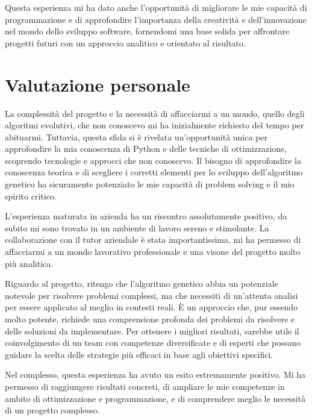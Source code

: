 Questa esperienza mi ha dato anche l'opportunità di migliorare le mie capacità di programmazione e di approfondire l'importanza della creatività e dell'innovazione nel mondo dello sviluppo software, fornendomi una base solida per affrontare progetti futuri con un approccio analitico e orientato al risultato.

\section{Valutazione personale}

La complessità del progetto e la necessità di affacciarmi a un mondo, quello degli algoritmi evolutivi, che non conoscevo mi ha inizialmente richiesto del tempo per abituarmi. Tuttavia, questa sfida si è rivelata un'opportunità unica per approfondire la mia conoscenza di Python e delle tecniche di ottimizzazione, scoprendo tecnologie e approcci che non conoscevo. Il bisogno di approfondire la conoscenza teorica e di scegliere i corretti elementi per lo sviluppo dell'algoritmo genetico ha sicuramente potenziato le mie capacità di problem solving e il mio spirito critico.

L'esperienza maturata in azienda ha un riscontro assolutamente positivo, da subito mi sono trovato in un ambiente di lavoro sereno e stimolante. La collaborazione con il tutor aziendale è stata importantissima, mi ha permesso di affacciarmi a un mondo lavorativo professionale e una visone del progetto molto più analitica.

Riguardo al progetto, ritengo che l'algoritmo genetico abbia un potenziale notevole per risolvere problemi complessi, ma che necessiti di un'attenta analisi per essere applicato al meglio in contesti reali. È un approccio che, pur essendo molto potente, richiede una comprensione profonda dei problemi da risolvere e delle soluzioni da implementare. Per ottenere i migliori risultati, sarebbe utile il coinvolgimento di un team con competenze diversificate e di esperti che possano guidare la scelta delle strategie più efficaci in base agli obiettivi specifici.

Nel complesso, questa esperienza ha avuto un esito estremamente positivo. Mi ha permesso di raggiungere risultati concreti, di ampliare le mie competenze in ambito di ottimizzazione e programmazione, e di comprendere meglio le necessità di un progetto complesso.